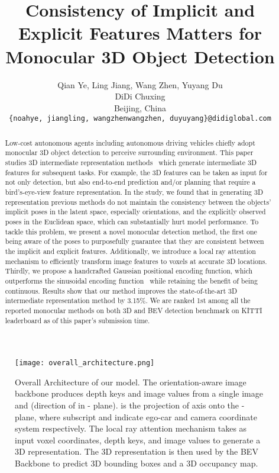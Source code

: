 \documentclass[10pt,twocolumn,letterpaper]{article}
\begin{document}
\title{Consistency of Implicit and Explicit Features Matters for Monocular 3D Object Detection}

\author{Qian Ye, Ling Jiang, Wang Zhen, Yuyang Du \\
DiDi Chuxing\\
Beijing, China\\
{\tt\small \{noahye, jiangling, wangzhenwangzhen, duyuyang\}@didiglobal.com}
}
\maketitle

\begin{abstract}
  Low-cost autonomous agents including autonomous driving vehicles chiefly adopt monocular 3D object detection to perceive surrounding environment. This paper studies 3D intermediate representation methods~\cite{reading2021categorical} which generate intermediate 3D features for subsequent tasks. For example, the 3D features can be taken as input for not only detection, but also end-to-end prediction and/or planning that require a bird's-eye-view feature representation. In the study, we found that in generating 3D representation previous methods do not maintain the consistency between the objects' implicit poses in the latent space, especially orientations, and the explicitly observed poses in the Euclidean space, which can substantially hurt model performance. To tackle this problem, we present a novel monocular detection method, the first one being aware of the poses to purposefully guarantee that they are consistent between the implicit and explicit features. Additionally, we introduce a local ray attention mechanism to efficiently transform image features to voxels at accurate 3D locations. Thirdly, we propose a handcrafted Gaussian positional encoding function, which outperforms the sinusoidal encoding function~\cite{NIPS2017_3f5ee243} while retaining the benefit of being continuous. Results show that our method improves the state-of-the-art 3D intermediate representation method by 3.15\%. We are ranked 1st among all the reported monocular methods on both 3D and BEV detection benchmark on KITTI leaderboard as of this paper's submission time. 
\end{abstract}

\begin{figure*}
  \centering
  \texttt{[image: overall\_architecture.png]}
  \caption{Overall Architecture of our model. The orientation-aware image backbone produces depth keys and image values from a single image and (direction of  in - plane).  is the projection of  axis onto the - plane, where subscript  and  indicate ego-car and camera coordinate system respectively. The local ray attention mechanism takes as input voxel coordinates, depth keys, and image values to generate a 3D representation. The 3D representation is then used by the BEV Backbone to predict 3D bounding boxes and a 3D occupancy map.}
  \label{fig:overall_architecture}
\end{figure*}
\end{document}
